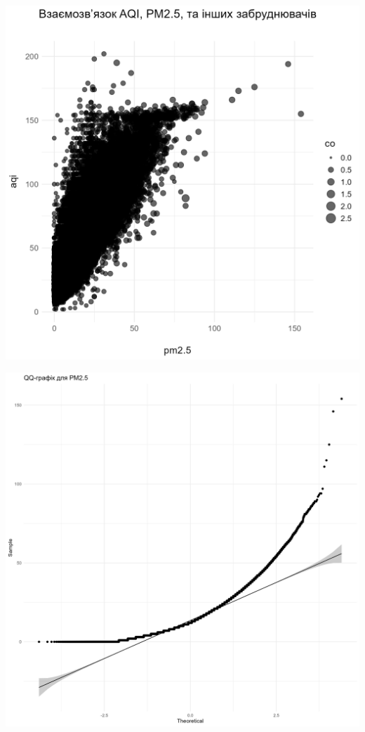 \documentclass[./report.tex]{subfiles}
\begin{document}
\begin{enumerate}
  \includegraphics[width=\linewidth]{plots/question1/aqi_pm_polutants.png}

  \includegraphics[width=\linewidth]{plots/question1/qq_pm2_5.png}


\end{enumerate}
\end{document}
